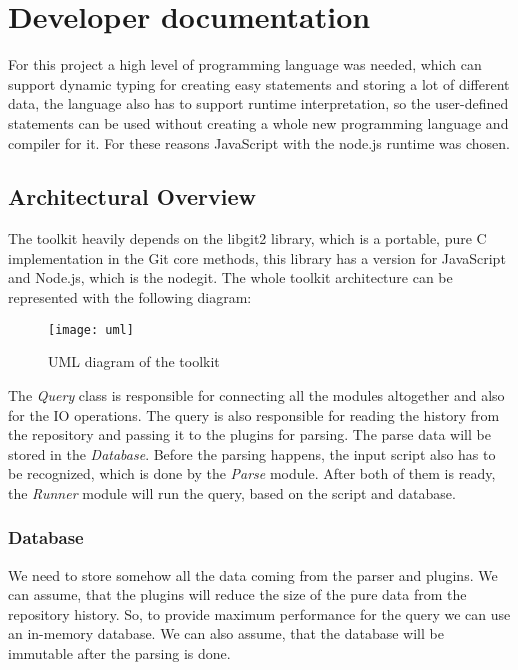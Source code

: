 \chapter{Developer documentation}
\label{ch:impl}

For this project a high level of programming language was needed, which can support dynamic typing for creating easy statements and storing a
lot of different data, the language also has to support runtime interpretation, so the user-defined statements can be used without
creating a whole new programming language and compiler for it. For these reasons JavaScript with the node.js runtime was chosen. 

\newpage

\section{Architectural Overview}

The toolkit heavily depends on the libgit2 \cite{libgit2} library, which is a portable, pure C implementation  in the Git core methods,
this library has a version for JavaScript and Node.js, which is the nodegit\cite{nodegit}.
The whole toolkit architecture can be represented with the following diagram:

\begin{figure}[H]
	\centering
	\texttt{[image: uml]}
	\caption{UML diagram of the toolkit}
	\label{fig:fig-help}
\end{figure}

The \textit{Query} class is responsible for connecting all the modules altogether and also for the IO operations. The query is also
responsible for reading the history from the repository and passing it to the plugins for parsing. The parse data will be stored
in the \textit{Database}. Before the parsing happens, the input script also has to be recognized, which is done by the \textit{Parse}
module. After both of them is ready, the \textit{Runner} module will run the query, based on the script and database.
\newpage

\subsection{Database}

We need to store somehow all the data coming from the parser and plugins. We can assume, that the plugins will reduce the size of the
pure data from the repository history. So, to provide maximum performance for the query we can use an in-memory database. 
We can also assume, that the database will be immutable after the parsing is done. 


